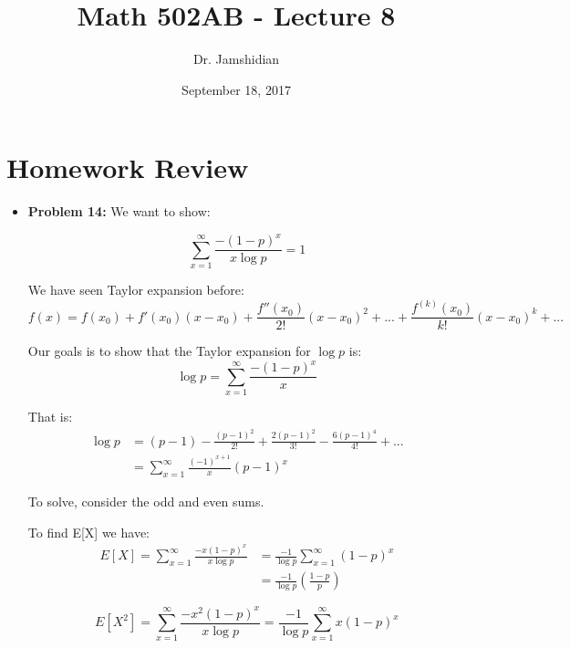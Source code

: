 \documentclass{article}
\title{Math 502AB - Lecture 8}
\author{Dr. Jamshidian}
\date{September 18, 2017}
\begin{document}
\maketitle

\section{Homework Review}

\begin{itemize}
    \item \textbf{Problem 14:} We want to show:
    
    \begin{equation*}
        \sum\limits_{x=1}^\infty \frac{-(1-p)^x}{x\log p} = 1
    \end{equation*}
    
    We have seen Taylor expansion before:
    \begin{equation*}
        f(x) = f(x_0) + f'(x_0)(x-x_0) + \frac{f''(x_0)}{2!}(x-x_0)^2 + ... + \frac{f^{(k)}(x_0)}{k!}(x-x_0)^k+...
    \end{equation*}
    
    Our goals is to show that the Taylor expansion for $\log p$ is:
    \begin{equation*}
        \log p = \sum_{x=1}^\infty \frac{-(1-p)^x}{x}
    \end{equation*}
    
    That is:
    \begin{equation*}
    \begin{split}
        \log p &= (p-1) - \frac{(p-1)^2}{2!} + \frac{2(p-1)^2}{3!} - \frac{6(p-1)^4}{4!} + ...\\
        &= \sum_{x=1}^\infty \frac{(-1)^{x+1}}{x}(p-1)^x
    \end{split}
    \end{equation*}
    
    To solve, consider the odd and even sums.
    
    To find E[X] we have:
    \begin{equation*}
        \begin{split}
            E[X] = \sum_{x=1}^\infty \frac{-x(1-p)^x}{x\log p} &= \frac{-1}{\log p} \sum_{x=1}^\infty (1-p)^x\\
            &= \frac{-1}{\log p} \left(\frac{1-p}{p}\right)
        \end{split}
    \end{equation*}
    
    \begin{equation*}
            E[X^2] = \sum_{x=1}^\infty \frac{-x^2(1-p)^x}{x\log p} = \frac{-1}{\log p} \sum_{x=1}^\infty x(1-p)^x
    \end{equation*}
    

\end{itemize}
\end{document}
